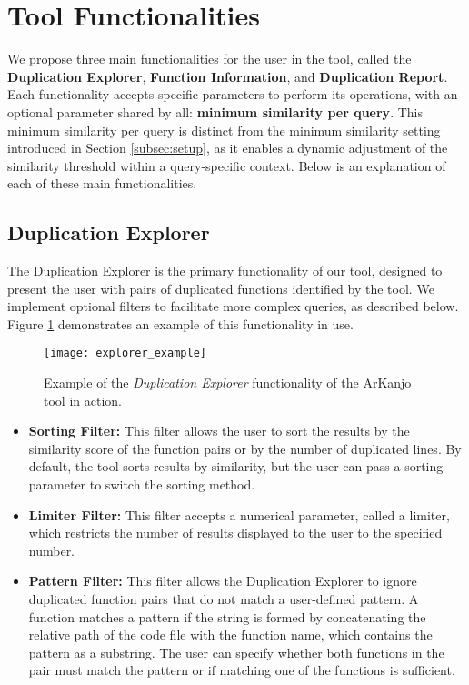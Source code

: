 \en

\section{Tool Functionalities}
\label{subsec:func}

We propose three main functionalities for the user in the tool, called the \textbf{Duplication Explorer}, \textbf{Function Information}, and \textbf{Duplication Report}. Each functionality accepts specific parameters to perform its operations, with an optional parameter shared by all: \textbf{minimum similarity per query}. This minimum similarity per query is distinct from the minimum similarity setting introduced in Section \ref{subsec:setup}, as it enables a dynamic adjustment of the similarity threshold within a query-specific context. Below is an explanation of each of these main functionalities.

\subsection{Duplication Explorer}

The Duplication Explorer is the primary functionality of our tool, designed to present the user with pairs of duplicated functions identified by the tool. We implement optional filters to facilitate more complex queries, as described below. Figure \ref{fig:explorer_ex} demonstrates an example of this functionality in use.

\begin{figure}
\texttt{[image: explorer\_example]}
\caption{Example of the \textit{Duplication Explorer} functionality of the ArKanjo tool in action.}
\label{fig:explorer_ex}
\end{figure}

\begin{itemize}
	\item \textbf{Sorting Filter:} This filter allows the user to sort the results by the similarity score of the function pairs or by the number of duplicated lines. By default, the tool sorts results by similarity, but the user can pass a sorting parameter to switch the sorting method.

	\item \textbf{Limiter Filter:} This filter accepts a numerical parameter, called a limiter, which restricts the number of results displayed to the user to the specified number.

	\item \textbf{Pattern Filter:} This filter allows the Duplication Explorer to ignore duplicated function pairs that do not match a user-defined pattern. A function matches a pattern if the string is formed by concatenating the relative path of the code file with the function name, which contains the pattern as a substring. The user can specify whether both functions in the pair must match the pattern or if matching one of the functions is sufficient.
\end{itemize}

